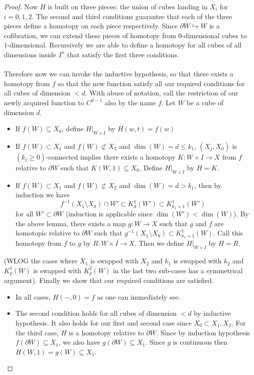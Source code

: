 \documentclass[a4paper]{article}
\begin{document}
\begin{lmm}{}{}
\begin{proof}
Now $H$ is built on three pieces: the union of cubes landing in $X_i$ for $i=0,1,2$. The second and third conditions guarantee that each of the three pieces define a homotopy on each piece respectively. Since $\partial W\hookrightarrow W$ is a cofibration, we can extend these pieces of homotopy from $0$-dimensional cubes to $1$-dimensional. Recursively we are able to define a homotopy for all cubes of all dimensions inside $I^n$ that satisfy the first three conditions. \\~\\

Therefore now we can invoke the inductive hypothesis, so that there exists a homotopy from $f$ so that the new function satisfy all our required conditions for all cubes of dimension $<d$. With abuse of notation, call the restriction of our newly acquired function to $C^{d-1}$ also by the name $f$. Let $W$ be a cube of dimension $d$. 
\begin{itemize}
\item If $f(W)\subseteq X_0$, define $H|_{W\times I}$ by $H(w,t)=f(w)$
\item If $f(W)\subset X_1$ and $f(W)\not\subset X_2$ and $\dim(W)=d\leq k_1$, $(X_j,X_0)$ is $(k_j\geq 0)$-connected implies there exists a homotopy $K:W\times I\to X$ from $f$ relative to $\partial W$ such that $K(W,1)\subseteq X_0$. Define $H|_{W\times I}$ by $H=K$. 
\item If $f(W)\subset X_1$ and $f(W)\not\subset X_2$ and $\dim(W)=d>k_1$, then by induction we have $$f^{-1}(X_1\setminus X_0)\cap W'\subset K_d^1(W')\subset K_{k_1+1}^1(W')$$ for all $W'\subset\partial W$ (induction is applicable since $\dim(W')<\dim(W)$). By the above lemma, there exists a map $g:W\to X$ such that $g$ and $f$ are homotopic relative to $\partial W$ such that $g^{-1}(X_1\setminus X_0)\subset K_{k_1+1}^1(W)$. Call this homotopy from $f$ to $g$ by $R:W\times I\to X$. Then we define $H|_{W\times I}$ by $H=R$. 
\end{itemize}
(WLOG the cases where $X_1$ is swapped with $X_2$ and $k_1$ is swapped with $k_2$ and $K_p^1(W)$ is swapped with $K_p^2(W)$ in the last two sub-cases has a symmetrical argument). Finally we show that our required conditions are satisfied. 
\begin{itemize}
\item In all cases, $H(-,0)=f$ as one can immediately see. 
\item The second condition holds for all cubes of dimension $<d$ by inductive hypothesis. It also holds for our first and second case since $X_0\subset X_1,X_2$. For the third case, $H$ is a homotopy relative to $\partial W$. Since by induction hypothesis $f(\partial W)\subseteq X_1$, we also have $g(\partial W)\subseteq X_1$. Since $g$ is continuous then $H(W,1)=g(W)\subseteq X_1$. 

\end{itemize}
\end{proof}
\end{lmm}
\end{document}

